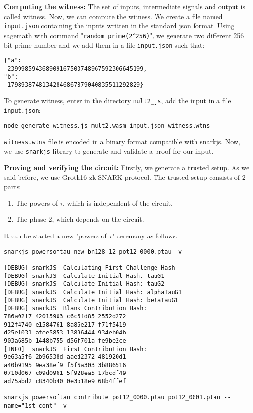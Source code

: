 \documentclass[a4paper,oneside,12pt]{book}
\begin{document}
\noindent \textbf{Computing the witness:} The set of inputs, intermediate signals and output is called witness. Now, we can compute the witness. We create a file named \verb|input.json| containing the inputs written in the standard json format. Using sagemath with command "\verb|random_prime(2^256)|", we generate two different 256 bit prime number and we add them in a file \verb|input.json| such that:

\begin{verbatim}
{"a":
 239998594368909167503748967592306645199, 
"b":
 17989387481342846867879040835511292829}
\end{verbatim}

\noindent To generate witness, enter in the directory \verb|mult2_js|, add the input in a file \verb|input.json|:

\begin{verbatim}
node generate_witness.js mult2.wasm input.json witness.wtns
\end{verbatim}

\noindent \verb|witness.wtns| file is encoded in a binary format compatible with snarkjs. Now, we use \verb|snarkjs| library to generate and validate a proof for our input. 

\noindent \textbf{Proving and verifying the circuit:} Firstly, we generate a trusted setup. As we said before, we use Groth16 zk-SNARK protocol. The trusted setup consists of 2 parts:

\begin{enumerate}
	\item The powers of $\tau$, which is independent of the circuit.
	\item The phase 2, which depends on the circuit.
\end{enumerate}

\noindent It can be started a new "powers of $\tau$" ceremony as follows:
\begin{verbatim}
snarkjs powersoftau new bn128 12 pot12_0000.ptau -v

[DEBUG] snarkJS: Calculating First Challenge Hash
[DEBUG] snarkJS: Calculate Initial Hash: tauG1
[DEBUG] snarkJS: Calculate Initial Hash: tauG2
[DEBUG] snarkJS: Calculate Initial Hash: alphaTauG1
[DEBUG] snarkJS: Calculate Initial Hash: betaTauG1
[DEBUG] snarkJS: Blank Contribution Hash:
786a02f7 42015903 c6c6fd85 2552d272
912f4740 e1584761 8a86e217 f71f5419
d25e1031 afee5853 13896444 934eb04b
903a685b 1448b755 d56f701a fe9be2ce
[INFO]  snarkJS: First Contribution Hash:
9e63a5f6 2b96538d aaed2372 481920d1
a40b9195 9ea38ef9 f5f6a303 3b886516
0710d067 c09d0961 5f928ea5 17bcdf49
ad75abd2 c8340b40 0e3b18e9 68b4ffef

snarkjs powersoftau contribute pot12_0000.ptau pot12_0001.ptau --name="1st_cont" -v
\end{verbatim}
\end{document}
